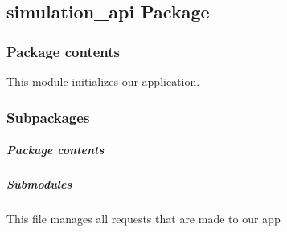 \documentclass[a4paper,landscape,10pt,english]{sphinxmanual}
\begin{document}
\subsection{simulation\_api Package}
\label{\detokenize{code_docs/simulation_api:simulation-api-package}}\label{\detokenize{code_docs/simulation_api:code-api-package}}\label{\detokenize{code_docs/simulation_api::doc}}

\subsubsection{Package contents}
\label{\detokenize{code_docs/simulation_api:module-simulation_api}}\label{\detokenize{code_docs/simulation_api:package-contents}}
This module initializes our application.


\subsubsection{Subpackages}
\label{\detokenize{code_docs/simulation_api:subpackages}}

\paragraph{}
\label{\detokenize{code_docs/simulation_api.controller:simulation-api-controller}}\label{\detokenize{code_docs/simulation_api.controller::doc}}

\subparagraph{Package contents}
\label{\detokenize{code_docs/simulation_api.controller:module-simulation_api.controller}}\label{\detokenize{code_docs/simulation_api.controller:package-contents}}

\subparagraph{Submodules}
\label{\detokenize{code_docs/simulation_api.controller:submodules}}

\subparagraph{}
\label{\detokenize{code_docs/simulation_api.controller:module-simulation_api.controller.main}}\label{\detokenize{code_docs/simulation_api.controller:simulation-api-controller-main}}
This file manages all requests that are made to our app
\end{document}
